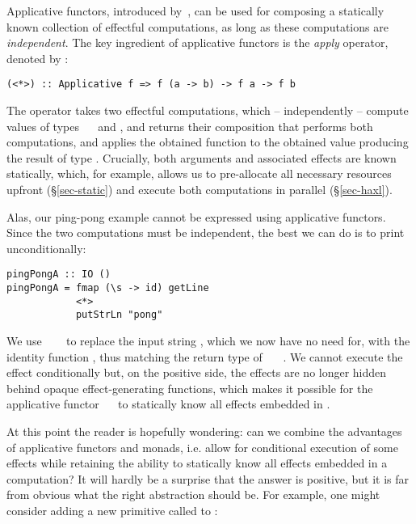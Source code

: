 Applicative functors, introduced by~\citet{mcbride2008applicative}, can be used
for composing a statically known collection of effectful computations, as long
as these computations are \emph{independent}. The key ingredient of applicative
functors is the \emph{apply} operator, denoted by \hs{<*>}:

\vspace{1mm}
\begin{verbatim}
(<*>) :: Applicative f => f (a -> b) -> f a -> f b
\end{verbatim}
\vspace{1mm}

\noindent
The operator takes two effectful computations, which -- independently -- compute
values of types ~\hs{->}~ and , and returns their composition
that performs both computations, and applies the obtained function to the
obtained value producing the result of type . Crucially, both arguments
and associated effects are known statically, which, for example, allows us to
pre-allocate all necessary resources upfront (\S\ref{sec-static}) and execute
both computations in parallel (\S\ref{sec-haxl}).

Alas, our ping-pong example cannot be expressed using applicative functors.
Since the two computations must be independent, the best we can do is to print
 unconditionally:

\vspace{1mm}
\begin{verbatim}
pingPongA :: IO ()
pingPongA = fmap (\s -> id) getLine
            <*>
            putStrLn "pong"
\end{verbatim}
\vspace{1mm}

\noindent
We use ~\hs{(\s}~\hs{->}~ to replace the input string ,
which we now have no need for, with the identity function , thus matching
the return type of ~\hs{::}~~\hs{()}. We cannot execute the
 effect conditionally but, on the positive side, the effects are no
longer hidden behind opaque effect-generating functions, which makes it possible
for the applicative functor ~\hs{=}~ to statically know all effects
embedded in .

At this point the reader is hopefully wondering: can we combine the advantages
of applicative functors and monads, i.e. allow for conditional execution of some
effects while retaining the ability to statically know all effects embedded in
a computation? It will hardly be a surprise that the answer is positive, but it
is far from obvious what the right abstraction should be. For example, one might
consider adding a new primitive called  to :

